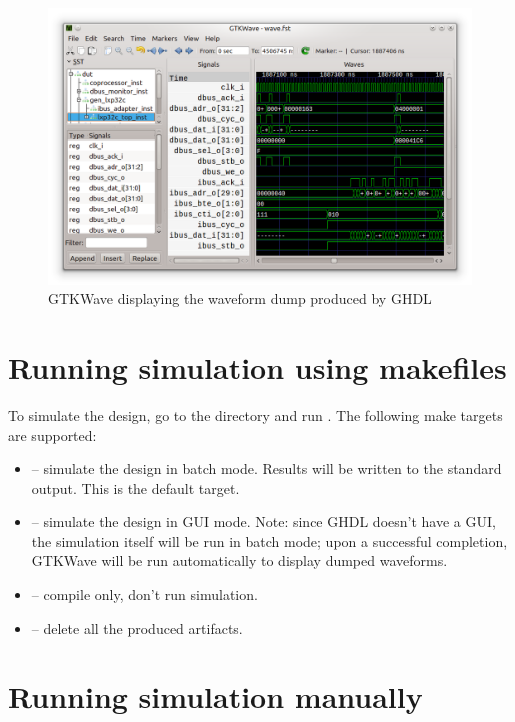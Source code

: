 \documentclass[a4paper,12pt,twoside,extrafontsizes]{memoir}
\begin{document}
\begin{figure}[htbp]
	\centering
	\includegraphics[scale=0.65]{images/gtkwave.png}
	\caption{GTKWave displaying the \lxp{} waveform dump produced by GHDL}
	\label{fig:gtkwave}
\end{figure}

\section{Running simulation using makefiles}

To simulate the design, go to the  directory and run . The following make targets are supported:

\begin{itemize}
	\item {} -- simulate the design in batch mode. Results will be written to the standard output. This is the default target.
	\item {} -- simulate the design in GUI mode. Note: since GHDL doesn't have a GUI, the simulation itself will be run in batch mode; upon a successful completion, GTKWave will be run automatically to display dumped waveforms.
	\item {} -- compile only, don't run simulation.
	\item {} -- delete all the produced artifacts.
\end{itemize}

\section{Running simulation manually}
\label{sec:simmanual}
\end{document}
